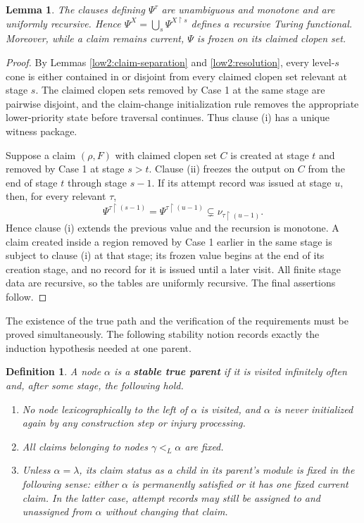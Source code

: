\documentclass[10pt,a4paper]{amsart}
\newtheorem{lemma}[theorem]{Lemma}
\newtheorem{definition}[theorem]{Definition}
\begin{document}
\begin{lemma}\label{low2:functional}
The clauses defining $\Psi^\tau$ are unambiguous and monotone and are
uniformly recursive. Hence
$\Psi^X=\bigcup_s\Psi^{X\upharpoonright s}$ defines a recursive Turing
functional. Moreover, while a claim remains current, $\Psi$ is frozen on its
claimed clopen set.
\end{lemma}

\begin{proof}
By Lemmas \ref{low2:claim-separation} and \ref{low2:resolution}, every
level-$s$ cone is either contained in or disjoint from every claimed clopen
set relevant at stage $s$. The claimed clopen sets removed by Case 1 at the
same stage are pairwise disjoint, and the claim-change initialization rule
removes the appropriate lower-priority state before traversal continues.
Thus clause (i) has a unique witness package.

Suppose a claim $(\rho,F)$ with claimed clopen set $C$ is created at stage
$t$ and removed by Case 1 at stage $s>t$. Clause (ii) freezes the output on
$C$ from the end of stage $t$ through stage $s-1$. If its attempt record was
issued at stage $u$, then, for every relevant $\tau$,
\[
        \Psi^{\tau\upharpoonright(s-1)}
        =\Psi^{\tau\upharpoonright(u-1)}
        \subsetneq \nu_{\tau\upharpoonright(u-1)}.
\]
Hence clause (i) extends the previous value and the recursion is monotone. A
claim created inside a region removed by Case 1 earlier in the same stage is
subject to clause (i) at that stage; its frozen value begins at the end of its
creation stage, and no record for it is issued until a later visit. All finite
stage data are recursive, so the tables are uniformly recursive. The final
assertions follow.
\end{proof}



The existence of the true path and the verification of the requirements must
be proved simultaneously. The following stability notion records exactly the
induction hypothesis needed at one parent.

\begin{definition}\label{low2:stable-true-parent}
A node $\alpha$ is a \textbf{stable true parent} if it is visited infinitely
often and, after some stage, the following hold.
\begin{enumerate}[label=(\alph*)]
\item No node lexicographically to the left of $\alpha$ is visited, and
      $\alpha$ is never initialized again by any construction step or injury
      processing.
\item All claims belonging to nodes $\gamma<_L\alpha$ are fixed.
\item Unless $\alpha=\lambda$, its claim status as a child in its parent's
      module is fixed in the following sense: either $\alpha$ is permanently
      satisfied or it has one fixed current claim. In the latter case,
      attempt records may still be assigned to and unassigned from $\alpha$
      without changing that claim.
\end{enumerate}
\end{definition}
\end{document}
